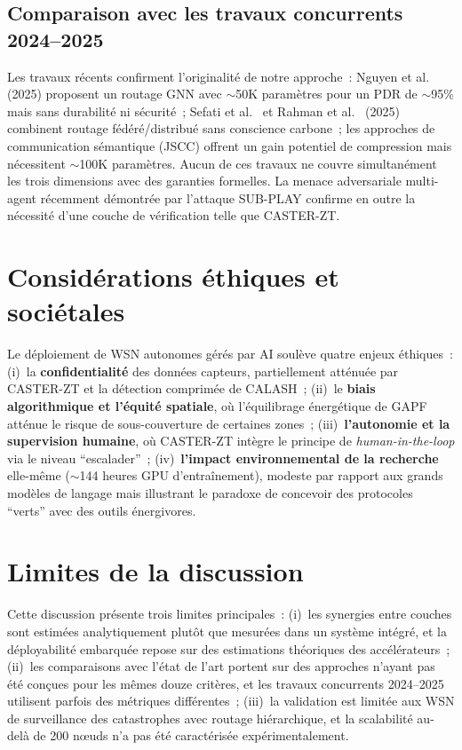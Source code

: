 \subsection{Comparaison avec les travaux concurrents 2024--2025}

Les travaux récents confirment l'originalité de notre approche~: Nguyen et al.\ \cite{Nguyen2025GNNIoT} (2025) proposent un routage GNN avec $\sim$50K paramètres pour un PDR de $\sim$95\% mais sans durabilité ni sécurité~; Sefati et al.\ \cite{sefati_federated_2025} et Rahman et al.\ \cite{rahman_distributed_2025} (2025) combinent routage fédéré/distribué sans conscience carbone~; les approches de communication sémantique (JSCC) offrent un gain potentiel de compression mais nécessitent $\sim$100K paramètres. Aucun de ces travaux ne couvre simultanément les trois dimensions avec des garanties formelles. La menace adversariale multi-agent récemment démontrée par l'attaque SUB-PLAY \cite{subplay_marl2025} confirme en outre la nécessité d'une couche de vérification telle que CASTER-ZT.



\section{Considérations éthiques et sociétales}\label{sec:disc-ethique}

Le déploiement de WSN autonomes gérés par AI soulève quatre enjeux éthiques~: (i)~la \textbf{confidentialité} des données capteurs, partiellement atténuée par CASTER-ZT et la détection comprimée de CALASH~; (ii)~le \textbf{biais algorithmique et l'équité spatiale}, où l'équilibrage énergétique de GAPF atténue le risque de sous-couverture de certaines zones~; (iii)~\textbf{l'autonomie et la supervision humaine}, où CASTER-ZT intègre le principe de \emph{human-in-the-loop} via le niveau ``escalader''~; (iv)~\textbf{l'impact environnemental de la recherche} elle-même ($\sim$144 heures GPU d'entraînement), modeste par rapport aux grands modèles de langage mais illustrant le paradoxe de concevoir des protocoles ``verts'' avec des outils énergivores.


\section{Limites de la discussion}\label{sec:disc-limites}

Cette discussion présente trois limites principales~: (i)~les synergies entre couches sont estimées analytiquement plutôt que mesurées dans un système intégré, et la déployabilité embarquée repose sur des estimations théoriques des accélérateurs~; (ii)~les comparaisons avec l'état de l'art portent sur des approches n'ayant pas été conçues pour les mêmes douze critères, et les travaux concurrents 2024--2025 utilisent parfois des métriques différentes~; (iii)~la validation est limitée aux WSN de surveillance des catastrophes avec routage hiérarchique, et la scalabilité au-delà de 200 n\oe{}uds n'a pas été caractérisée expérimentalement.
